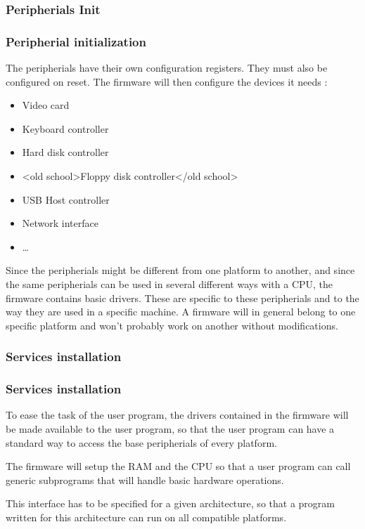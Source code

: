 \subsubsection{Peripherials Init}

\begin{frame}
  \frametitle{Peripherial initialization}

  The peripherials have their own configuration registers. They must also be configured on reset. The firmware will then configure the devices it needs :

  \-

  \begin{itemize}
  \item Video card
  \item Keyboard controller
  \item Hard disk controller
  \item {<old school>Floppy disk controller</old school>}
  \item USB Host controller
  \item Network interface
  \item \ldots
  \end{itemize}

  \-

  Since the peripherials might be different from one platform to another, and since the same peripherials can be used in several different ways with a CPU, the firmware contains basic drivers. These are specific to these peripherials and to the way they are used in a specific machine. A firmware will in general belong to one specific platform and won't probably work on another without modifications.

\end{frame}

\subsubsection{Services installation}

\begin{frame}
  \frametitle{Services installation}

  To ease the task of the user program, the drivers contained in the firmware will be made available to the user program, so that the user program can have a standard way to access the base peripherials of every platform.

  \-

  The firmware will setup the RAM and the CPU so that a user program can call generic subprograms that will handle basic hardware operations.

  \-

  This interface has to be specified for a given architecture, so that a program written for this architecture can run on all compatible platforms.

\end{frame}

